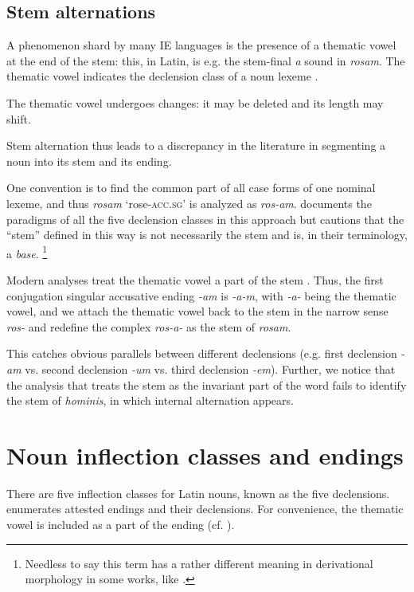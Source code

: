 \documentclass[a4paper, oneside, 12pt]{report}
\newcommand*{\citepage}[1]{p.~{#1}}
\newcommand*{\citepages}[1]{pp.~{#1}}
\newcommand*{\term}[1]{\emph{#1}}
\newcommand{\form}[1]{\emph{#1}}
\newcommand*{\category}[1]{\textsc{#1}}
\newcommand{\translate}[1]{`#1'}
\begin{document}
\subsection{Stem alternations}\label{sec:noun.stem-alternation}

A phenomenon shard by many IE languages is the presence of a thematic vowel at the end of the stem:
this, in Latin, is e.g. the stem-final \form{a} sound in \form{rosam}.
The thematic vowel indicates the declension class of a noun lexeme \citep[\citepage{45}]{oniga2014latin}.

The thematic vowel undergoes changes:
it may be deleted and its length may shift.

Stem alternation thus leads to a discrepancy in the literature in segmenting a noun into its stem and its ending.

One convention is to find the common part of all case forms of one nominal lexeme,
and thus \form{rosam} \translate{rose-\category{acc}.\category{sg}} is analyzed as \form{ros-am}.
\citet[\citepage{17}]{allen1903allen} documents the paradigms of all the five declension classes 
in this approach but cautions that the ``stem'' defined in this way is not necessarily the stem and is, in their terminology, a \term{base}.%
\footnote{
    Needless to say this term has a rather different meaning in derivational morphology in some works, like \citet{cgel}.
}

Modern analyses treat the thematic vowel a part of the stem \citep[\citepages{45, 63}]{oniga2014latin}.
Thus, the first conjugation singular accusative ending \form{-am} 
is \form{-a-m}, 
with \form{-a-} being the thematic vowel,
and we attach the thematic vowel back to the stem in the narrow sense \form{ros-} 
and redefine the complex \form{ros-a-} as the stem of \form{rosam}.

This catches obvious parallels between different declensions 
(e.g. first declension \form{-am} vs. second declension \form{-um} vs. third declension \form{-em}).
Further, we notice that the analysis that treats the stem as the invariant part of the word fails to identify the stem of \form{hominis},
in which internal alternation appears. 

\section{Noun inflection classes and endings}

There are five inflection classes for Latin nouns, known as the five declensions.
 enumerates attested endings and their declensions.
For convenience, the thematic vowel is included as a part of the ending (cf. ).
\end{document}
